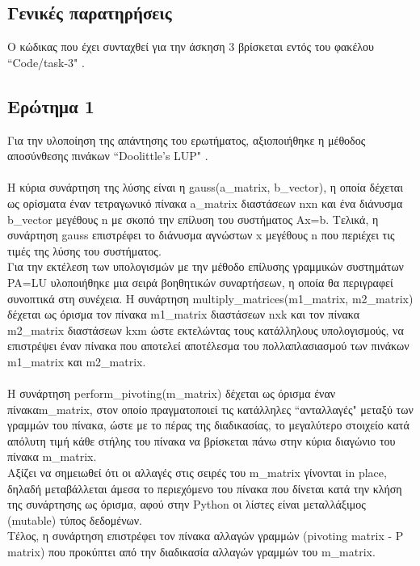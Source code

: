 \documentclass[a4paper,11pt]{article}
\newcommand{\lt}{\latintext}
\begin{document}
\subsection*{Γενικές παρατηρήσεις}
Ο κώδικας που έχει συνταχθεί για την άσκηση 3 βρίσκεται εντός του φακέλου {\lt ``Code/task-3" }.\\
\subsection*{Ερώτημα 1}
Για την υλοποίηση της απάντησης του ερωτήματος, αξιοποιήθηκε η μέθοδος αποσύνθεσης πινάκων {\lt ``Doolittle's LUP" }.\\
\\Η κύρια συνάρτηση της λύσης είναι η {\lt gauss(a\_matrix, b\_vector)}, η οποία δέχεται ως ορίσματα έναν τετραγωνικό πίνακα {\lt a\_matrix} διαστάσεων {\lt nxn} και ένα διάνυσμα {\lt b\_vector} μεγέθους {\lt n} με σκοπό την επίλυση του συστήματος {\lt Ax=b}. Τελικά, η συνάρτηση {\lt gauss} επιστρέφει το διάνυσμα αγνώστων {\lt x} μεγέθους {\lt n} που περιέχει τις τιμές της λύσης του συστήματος.\\
Για την εκτέλεση των υπολογισμών με την μέθοδο επίλυσης γραμμικών συστημάτων {\lt PA=LU} υλοποιήθηκε μια σειρά βοηθητικών συναρτήσεων, η οποία θα περιγραφεί συνοπτικά στη συνέχεια. 
Η συνάρτηση {\lt multiply\_matrices(m1\_matrix, m2\_matrix)} δέχεται ως όρισμα τον πίνακα {\lt m1\_matrix} διαστάσεων {\lt nxk} και τον πίνακα {\lt m2\_matrix} διαστάσεων {\lt kxm} ώστε εκτελώντας τους κατάλληλους υπολογισμούς, να επιστρέψει έναν πίνακα που αποτελεί αποτέλεσμα του πολλαπλασιασμού των πινάκων {\lt m1\_matrix} και {\lt m2\_matrix}.\\
\\H συνάρτηση {\lt perform\_pivoting(m\_matrix)} δέχεται ως όρισμα έναν πίνακα{\lt m\_matrix}, στον οποίο πραγματοποιεί τις κατάλληλες ``ανταλλαγές" μεταξύ των γραμμών του πίνακα, ώστε με το πέρας της διαδικασίας,  το μεγαλύτερο στοιχείο κατά απόλυτη τιμή κάθε στήλης του πίνακα να βρίσκεται πάνω στην κύρια διαγώνιο του πίνακα {\lt m\_matrix}. \\Αξίζει να σημειωθεί ότι οι αλλαγές στις σειρές του {\lt m\_matrix} γίνονται {\lt in place},
δηλαδή μεταβάλλεται άμεσα το περιεχόμενο του πίνακα που δίνεται κατά την κλήση της συνάρτησης ως όρισμα, αφού στην {\lt Python} οι λίστες είναι μεταλλάξιμος {\lt (mutable)} τύπος δεδομένων.\\
Τέλος, η συνάρτηση επιστρέφει τον πίνακα αλλαγών γραμμών {\lt (pivoting matrix - P matrix)} που προκύπτει από την διαδικασία αλλαγών γραμμών του {\lt m\_matrix}.\\
\end{document}
